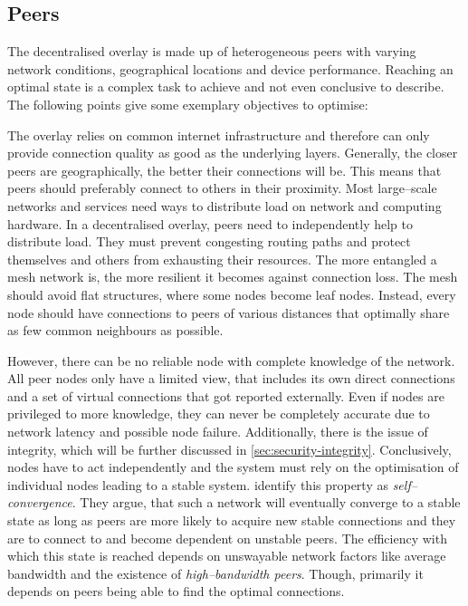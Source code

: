 \subsection{Peers}
The decentralised overlay is made up of heterogeneous peers with varying network conditions, geographical locations and device performance. Reaching an optimal state is a complex task to achieve and not even conclusive to describe. The following points give some exemplary objectives to optimise:
\begin{itemize}
    The overlay relies on common internet infrastructure and therefore can only provide connection quality as good as the underlying layers. Generally, the closer peers are geographically, the better their connections will be. This means that peers should preferably connect to others in their proximity.
    Most large–scale networks and services need ways to distribute load on network and computing hardware. In a decentralised overlay, peers need to independently help to distribute load. They must prevent congesting routing paths and protect themselves and others from exhausting their resources.
    The more entangled a mesh network is, the more resilient it becomes against connection loss. The mesh should avoid flat structures, where some nodes become leaf nodes. Instead, every node should have connections to peers of various distances that optimally share as few common neighbours as possible.
\end{itemize}

However, there can be no reliable node with complete knowledge of the network. All peer nodes only have a limited view, that includes its own direct connections and a set of virtual connections that got reported externally. Even if nodes are privileged to more knowledge, they can never be completely accurate due to network latency and possible node failure. Additionally, there is the issue of integrity, which will be further discussed in \vref{sec:security-integrity}. Conclusively, nodes have to act independently and the system must rely on the optimisation of individual nodes leading to a stable system. \citet*[V.B]{coolstreaming-design-theory} identify this property as \textit{self–convergence}. They argue, that such a network will eventually converge to a stable state as long as peers are more likely to acquire new stable connections and they are to connect to and become dependent on unstable peers. The efficiency with which this state is reached depends on unswayable network factors like average bandwidth and the existence of \textit{high–bandwidth peers}. Though, primarily it depends on peers being able to find the optimal connections.

